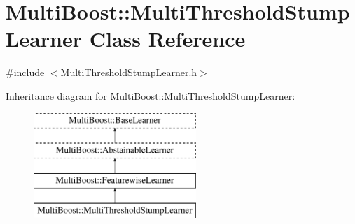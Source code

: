 \hypertarget{classMultiBoost_1_1MultiThresholdStumpLearner}{
\section{MultiBoost::MultiThresholdStumpLearner Class Reference}
\label{classMultiBoost_1_1MultiThresholdStumpLearner}
}


{\ttfamily \#include $<$MultiThresholdStumpLearner.h$>$}

Inheritance diagram for MultiBoost::MultiThresholdStumpLearner:\begin{figure}[H]
\begin{center}
\leavevmode
\includegraphics[height=4.000000cm]{classMultiBoost_1_1MultiThresholdStumpLearner}
\end{center}
\end{figure}
